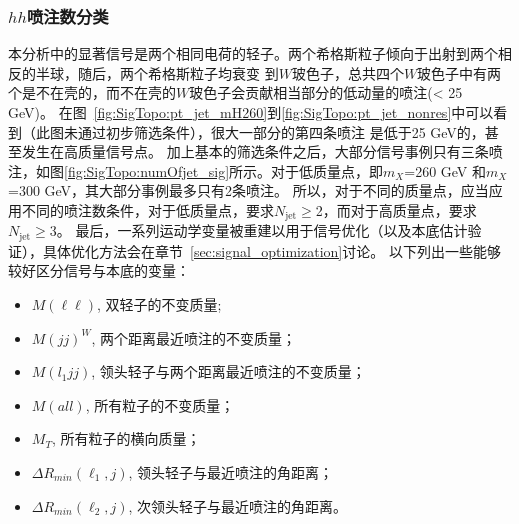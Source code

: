 \subsubsection{$hh$喷注数分类}\label{subsubsec:hh_optimization}
本分析中的显著信号是两个相同电荷的轻子。两个希格斯粒子倾向于出射到两个相反的半球，随后，两个希格斯粒子均衰变
到$W$玻色子，总共四个$W$玻色子中有两个是不在壳的，而不在壳的$W$玻色子会贡献相当部分的低动量的喷注(\pt < 25 GeV)。
在图~\ref{fig:SigTopo:pt_jet_mH260}到\ref{fig:SigTopo:pt_jet_nonres}中可以看到（此图未通过初步筛选条件），很大一部分的第四条喷注 \pt 是低于25 GeV的，甚至发生在高质量信号点。
加上基本的筛选条件之后，大部分信号事例只有三条喷注，如图\ref{fig:SigTopo:numOfjet_sig}所示。对于低质量点，即$m_X$=260 GeV 和$m_X$=300 GeV，其大部分事例最多只有2条喷注。
所以，对于不同的质量点，应当应用不同的喷注数条件，对于低质量点，要求$N_\text{jet}\ge$2，而对于高质量点，要求$N_\text{jet}\ge$3。
最后，一系列运动学变量被重建以用于信号优化（以及本底估计验证），具体优化方法会在章节~\ref{sec:signal_optimization}讨论。
以下列出一些能够较好区分信号与本底的变量：
\begin{itemize}
 \item $M(\ell\ell)$, 双轻子的不变质量;
 \item $M(jj)^W$, 两个距离最近喷注的不变质量；%
 \item $M(l_1jj)$, 领头轻子与两个距离最近喷注的不变质量；%
 \item $M(all)$, 所有粒子的不变质量；%
 \item $M_T$, 所有粒子的横向质量；%
 \item $\Delta R_{min}(\ell_1, j)$, 领头轻子与最近喷注的角距离；%
 \item $\Delta R_{min}(\ell_2, j)$, 次领头轻子与最近喷注的角距离。%
\end{itemize}

